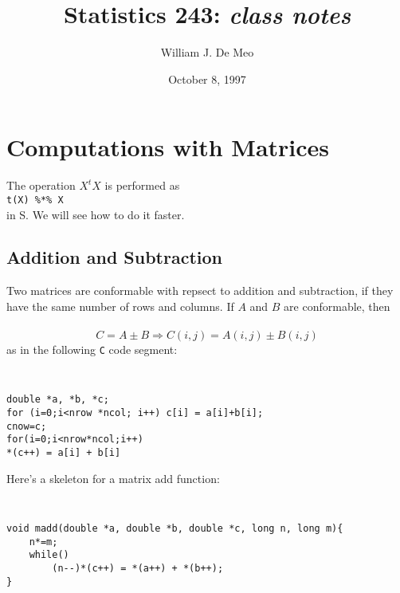 \documentclass{article}
\begin{document}
\title{Statistics 243: \emph{class notes}}
\author{William J. De Meo}
\date{October 8, 1997 }
\maketitle

\section{Computations with Matrices}
The operation $X^tX$ is performed as \\
{\tt t(X) \%*\% X }
\\
in S.  We will see how to do it faster.

\subsection{Addition and Subtraction}
Two matrices are conformable with repsect to addition and subtraction,
if they have the same number of rows and columns.  If $A$ and $B$ are 
conformable, then \\\\
\[C = A \pm B \Rightarrow C(i,j) = A(i,j) \pm B(i,j) \]
as in the following {\tt C} code segment:
{\tt
\begin{verbatim}
double *a, *b, *c;
for (i=0;i<nrow *ncol; i++) c[i] = a[i]+b[i];
cnow=c;
for(i=0;i<nrow*ncol;i++)
*(c++) = a[i] + b[i]
\end{verbatim}}
Here's a skeleton for a matrix add function:
{\tt
\begin{verbatim}
void madd(double *a, double *b, double *c, long n, long m){
    n*=m;
    while()
        (n--)*(c++) = *(a++) + *(b++);
}
\end{verbatim}}
\end{document}
